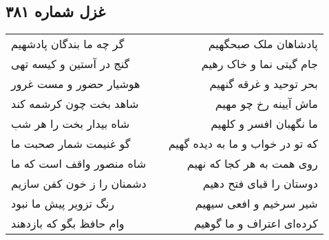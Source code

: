 \begin{center}
\section*{غزل شماره ۳۸۱}
\label{sec:sh381}
\begin{longtable}{l p{0.5cm} r}
گر چه ما بندگان پادشهیم
&&
پادشاهان ملک صبحگهیم
\\
گنج در آستین و کیسه تهی
&&
جام گیتی نما و خاک رهیم
\\
هوشیار حضور و مست غرور
&&
بحر توحید و غرقه گنهیم
\\
شاهد بخت چون کرشمه کند
&&
ماش آیینه رخ چو مهیم
\\
شاه بیدار بخت را هر شب
&&
ما نگهبان افسر و کلهیم
\\
گو غنیمت شمار صحبت ما
&&
که تو در خواب و ما به دیده گهیم
\\
شاه منصور واقف است که ما
&&
روی همت به هر کجا که نهیم
\\
دشمنان را ز خون کفن سازیم
&&
دوستان را قبای فتح دهیم
\\
رنگ تزویر پیش ما نبود
&&
شیر سرخیم و افعی سیهیم
\\
وام حافظ بگو که بازدهند
&&
کرده‌ای اعتراف و ما گوهیم
\\
\end{longtable}
\end{center}
